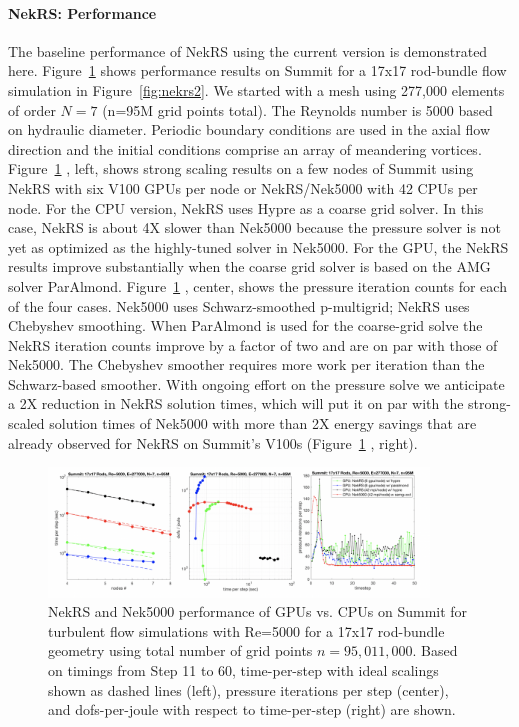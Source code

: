 \documentclass[11pt,letterpaper,english]{article}
\begin{document}
\paragraph{NekRS: Performance} The baseline performance of NekRS using the current version \cite{tomov2019ecp} is demonstrated here. Figure~\ref{fig:nekrs1} shows performance results on Summit for a 17x17 rod-bundle flow simulation in Figure~\ref{fig:nekrs2}. We started with a mesh using 277,000 elements of order $N=7$ (n=95M grid points total). The Reynolds number is 5000 based on hydraulic diameter. Periodic boundary conditions are used in the axial flow direction and the initial conditions comprise an array of meandering vortices.  Figure~\ref{fig:nekrs1} , left, shows strong scaling results on a few nodes of Summit using NekRS with six V100 GPUs per node or NekRS/Nek5000 with 42 CPUs per node. For the CPU version, NekRS uses Hypre as a coarse grid solver. In this case, NekRS is about 4X slower than Nek5000 because the pressure solver is not yet as optimized as the highly-tuned solver in Nek5000. For the GPU, the NekRS results improve substantially when the coarse grid solver is based on the AMG solver ParAlmond.  Figure~\ref{fig:nekrs1} , center, shows the pressure iteration counts for each of the four cases. Nek5000 uses Schwarz-smoothed p-multigrid; NekRS uses Chebyshev smoothing. When ParAlmond is used for the coarse-grid solve the NekRS iteration counts improve by a factor of two and are on par with those of Nek5000. The Chebyshev smoother requires more work per iteration than the Schwarz-based smoother.  With ongoing effort on the pressure solve we anticipate a 2X reduction in NekRS solution times, which will put it on par with the strong-scaled solution times of Nek5000 with more than 2X energy savings that are already observed for NekRS on Summit's V100s (Figure~\ref{fig:nekrs1} , right).

\begin{figure}[h]
\centering
\includegraphics[width=0.9\textwidth]{../figures/performance_nekrs}
\caption{ NekRS and Nek5000 performance of GPUs vs. CPUs on Summit for turbulent flow simulations with Re=5000 for a 17x17 rod-bundle geometry using total number of grid points $n=95,011,000$. Based on timings from Step 11 to 60, time-per-step with ideal scalings shown as dashed lines (left), pressure iterations per step (center), and dofs-per-joule with respect to time-per-step (right) are shown.}
\label{fig:nekrs1}
\end{figure}
\end{document}

